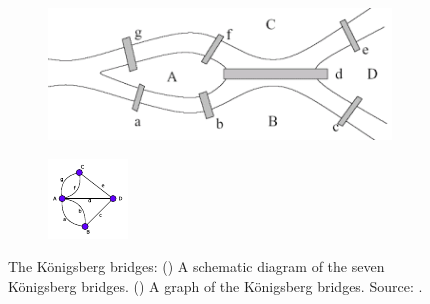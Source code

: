 \documentclass[10pt,a4paper]{article}
\begin{document}
\begin{figure}[!h]
	\centering
	\begin{subfigure}[b]{0.45\textwidth}
		\includegraphics[width=\textwidth]{images/koningsberg.png}
		\caption{}
		\label{kornbridge}
	\end{subfigure}
	\qquad
	\begin{subfigure}[b]{0.19\textwidth}
		\includegraphics[width=\textwidth]{images/bridge-graph.pdf}
		\caption{}
		\label{bridgegraph}
	\end{subfigure}
	\caption{The K\"{o}nigsberg bridges: () A schematic diagram of the seven K\"{o}nigsberg bridges. () A graph of the K\"{o}nigsberg bridges. Source: \citep{googleimages}. }
	\label{bridgeproblem}
\end{figure} 
\end{document}
